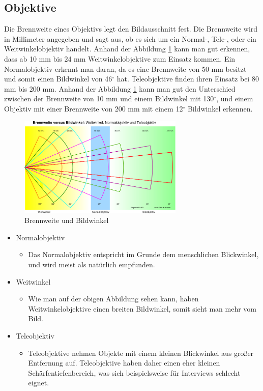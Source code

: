 \subsection{Objektive}
Die Brennweite eines Objektivs legt den Bildausschnitt fest. Die Brennweite wird in Millimeter angegeben und sagt aus, ob es sich um ein Normal-, Tele-, oder ein Weitwinkelobjektiv handelt.
Anhand der Abbildung \ref{fig:abb1} kann man gut erkennen, dass ab 10 mm bis 24 mm Weitwinkelobjektive zum Einsatz kommen. Ein Normalobjektiv erkennt man daran, da es eine Brennweite von 50 mm besitzt und somit einen Bildwinkel von 46$^\circ$ hat. Teleobjektive finden ihren Einsatz bei 80 mm bis 200 mm.\citep{objektiv} Anhand der Abbildung \ref{fig:abb1} kann man gut den Unterschied zwischen der Brennweite von 10 mm und einem Bildwinkel mit 130$^\circ$, und einem Objektiv mit einer Brennweite von 200 mm mit einem 12$^\circ$ Bildwinkel erkennen. 
\begin{figure}[H]
	\centering
	\includegraphics[width=0.7\textwidth]{abb1} 
	\caption[Brennweite und Bildwinkel]{Brennweite und Bildwinkel\footnotemark}\label{fig:abb1}
\end{figure}
\begin{itemize}
	\item Normalobjektiv
		\begin{itemize}
		\item Das Normalobjektiv entspricht im Grunde dem menschlichen Blickwinkel, und wird meist als natürlich empfunden.\citep{normalobjektiv}
		\end{itemize}
	\item Weitwinkel
		\begin{itemize}
		\item Wie man auf der obigen Abbildung sehen kann, haben Weitwinkelobjektive einen breiten Bildwinkel, somit sieht man mehr vom Bild.\citep{normalobjektiv}
		\end{itemize}
	\item Teleobjektiv
		\begin{itemize}
		\item Teleobjektive nehmen Objekte mit einem kleinen Blickwinkel aus großer Entfernung auf. Teleobjektive haben daher einen eher kleinen Schärfentiefenbereich, was sich beispielsweise für Interviews schlecht eignet.\citep{tele}
\end{itemize}
\end{itemize}
